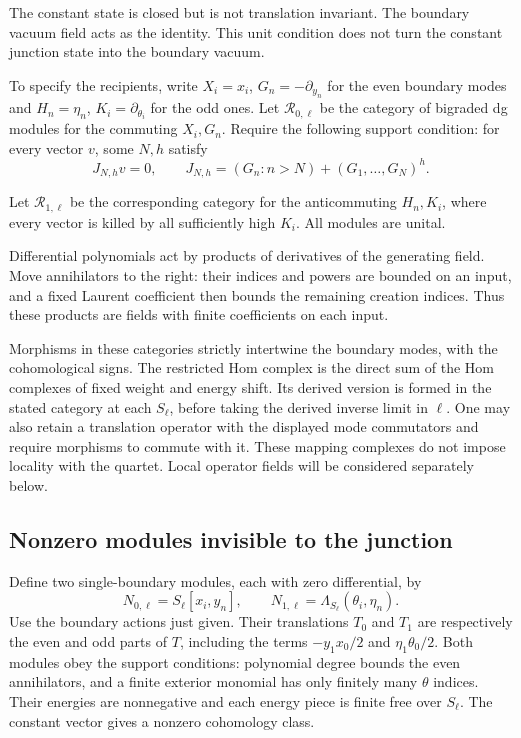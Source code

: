 The constant state is closed but is not translation invariant.
The boundary vacuum field acts as the identity. This unit
condition does not turn the constant junction state into the
boundary vacuum.

To specify the recipients, write
$X_i=x_i$, $G_n=-\partial_{y_n}$ for the even boundary modes
and $H_n=\eta_n$, $K_i=\partial_{\theta_i}$ for the odd ones.
Let $\mathcal R_{0,\ell}$ be the category of bigraded dg modules
for the commuting $X_i,G_n$. Require the following support
condition: for every vector $v$, some $N,h$ satisfy
\[
 J_{N,h}v=0,\qquad
 J_{N,h}=(G_n:n>N)+(G_1,\ldots,G_N)^h.
\]

Let $\mathcal R_{1,\ell}$ be the corresponding category for the
anticommuting $H_n,K_i$, where every vector is killed by all
sufficiently high $K_i$. All modules are unital.

Differential
polynomials act by products of derivatives of the generating
field. Move annihilators to the right: their indices and powers
are bounded on an input, and a fixed Laurent coefficient then
bounds the remaining creation indices. Thus these products
are fields with finite coefficients on each input.

Morphisms in these categories strictly intertwine the boundary
modes, with the cohomological signs. The restricted Hom complex
is the direct sum of the Hom complexes of fixed weight and
energy shift. Its derived version is formed in the stated
category at each $S_\ell$, before taking the derived inverse
limit in $\ell$. One may also retain a translation operator
with the displayed mode commutators and require morphisms to
commute with it. These mapping complexes do not impose
locality with the quartet. Local
operator fields will be considered separately below.

\subsection{Nonzero modules invisible to the junction}

Define two single-boundary modules, each with zero differential,
by
\[
 N_{0,\ell}=S_\ell[x_i,y_n],\qquad
 N_{1,\ell}=\Lambda_{S_\ell}(\theta_i,\eta_n).
\]
Use the boundary actions just given. Their translations $T_0$
and $T_1$ are respectively the even and odd parts of $T$,
including the terms $-y_1x_0/2$ and $\eta_1\theta_0/2$.
Both modules obey the support conditions: polynomial degree
bounds the even annihilators, and a finite exterior monomial
has only finitely many $\theta$ indices. Their energies are
nonnegative and each energy piece is finite free over
$S_\ell$. The constant vector gives a nonzero cohomology class.

